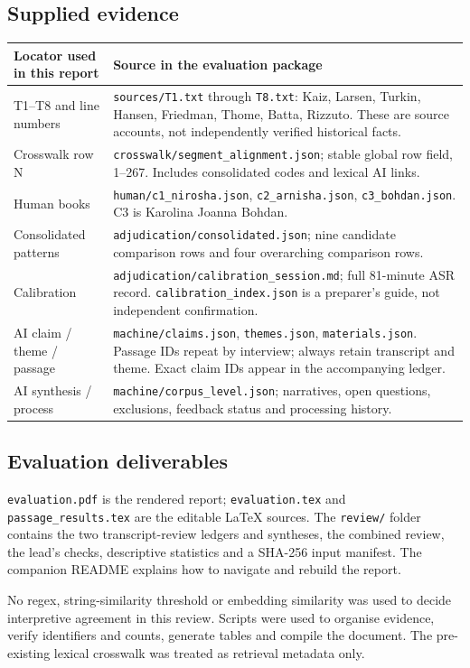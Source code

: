 \documentclass[10pt,a4paper]{article}
\begin{document}
\subsection*{Supplied evidence}
\begin{tabularx}{\linewidth}{@{}p{4.2cm}Y@{}}
\toprule
\textbf{Locator used in this report} & \textbf{Source in the evaluation package}\tabularnewline\midrule
T1--T8 and line numbers & \texttt{sources/T1.txt} through \texttt{T8.txt}: Kaiz, Larsen, Turkin, Hansen, Friedman, Thome, Batta, Rizzuto. These are source accounts, not independently verified historical facts.\tabularnewline
Crosswalk row N & \texttt{crosswalk/segment\_alignment.json}; stable global row field, 1--267. Includes consolidated codes and lexical AI links.\tabularnewline
Human books & \texttt{human/c1\_nirosha.json}, \texttt{c2\_arnisha.json}, \texttt{c3\_bohdan.json}. C3 is Karolina Joanna Bohdan.\tabularnewline
Consolidated patterns & \texttt{adjudication/consolidated.json}; nine candidate comparison rows and four overarching comparison rows.\tabularnewline
Calibration & \texttt{adjudication/calibration\_session.md}; full 81-minute ASR record. \texttt{calibration\_index.json} is a preparer's guide, not independent confirmation.\tabularnewline
AI claim / theme / passage & \texttt{machine/claims.json}, \texttt{themes.json}, \texttt{materials.json}. Passage IDs repeat by interview; always retain transcript and theme. Exact claim IDs appear in the accompanying ledger.\tabularnewline
AI synthesis / process & \texttt{machine/corpus\_level.json}; narratives, open questions, exclusions, feedback status and processing history.\tabularnewline\bottomrule
\end{tabularx}

\subsection*{Evaluation deliverables}
\texttt{evaluation.pdf} is the rendered report; \texttt{evaluation.tex} and \texttt{passage\_results.tex} are the editable LaTeX sources. The \texttt{review/} folder contains the two transcript-review ledgers and syntheses, the combined review, the lead's checks, descriptive statistics and a SHA-256 input manifest. The companion README explains how to navigate and rebuild the report.

No regex, string-similarity threshold or embedding similarity was used to decide interpretive agreement in this review. Scripts were used to organise evidence, verify identifiers and counts, generate tables and compile the document. The pre-existing lexical crosswalk was treated as retrieval metadata only.
\end{document}
